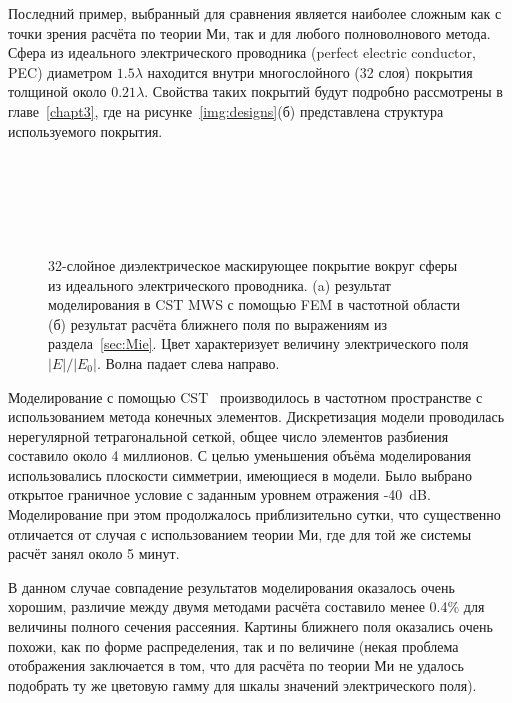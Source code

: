Последний пример, выбранный для сравнения является наиболее сложным
как с точки зрения расчёта по теории Ми, так и для любого
полноволнового метода. Сфера из идеального электрического проводника
(perfect electric conductor, PEC) диаметром $1.5\lambda$ находится
внутри многослойного (32 слоя) покрытия толщиной около
$0.21\lambda$. Свойства таких покрытий будут подробно рассмотрены в
главе~\ref{chapt3}, где на рисунке~\ref{img:designs}(б) представлена
структура используемого покрытия.
\begin{figure}[p] 
  \begin{minipage}[ht]{0.99\linewidth}
  \end{minipage}\\
  \vfill
  \begin{minipage}[ht]{0.99\linewidth}
  \end{minipage}\\
  \vfill
  \begin{minipage}[ht]{0.95\linewidth}
  \end{minipage}\\
  \vfill
  \begin{minipage}[ht]{0.99\linewidth}
  \end{minipage}
  \caption{32-слойное диэлектрическое маскирующее покрытие вокруг
    сферы из идеального электрического проводника. (a) результат
    моделирования в CST MWS с помощью FEM в частотной области (б)
    результат расчёта ближнего поля по выражениям из
    раздела~\ref{sec:Mie}. Цвет характеризует величину электрического
    поля $|E|/|E_0|$. Волна падает слева направо.\label{img:e32layer}}
\end{figure}

Моделирование с помощью CST~\cite{CST-web} производилось в частотном
пространстве с использованием метода конечных элементов. Дискретизация
модели проводилась нерегулярной тетрагональной сеткой, общее число
элементов разбиения составило около 4 миллионов.  С целью уменьшения
объёма моделирования использовались плоскости симметрии, имеющиеся в
модели. Было выбрано открытое граничное условие с заданным уровнем
отражения -40~dB. Моделирование при этом продолжалось приблизительно
сутки, что существенно отличается от случая с использованием теории
Ми, где для той же системы расчёт занял около 5 минут.

В данном случае совпадение результатов моделирования оказалось очень
хорошим, различие между двумя методами расчёта составило менее 0.4\%
для величины полного сечения рассеяния. Картины ближнего поля
оказались очень похожи, как по форме распределения, так и по 
величине (некая проблема отображения заключается в том, что для
расчёта по теории Ми не удалось подобрать ту же цветовую гамму для
шкалы значений электрического поля).

